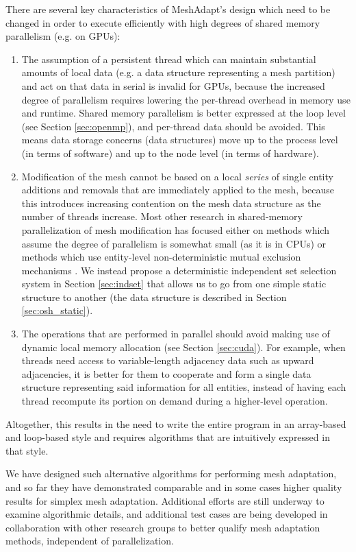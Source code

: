 There are several key characteristics of MeshAdapt's design
which need to be changed in order to execute efficiently with
high degrees of shared memory parallelism (e.g. on GPUs):
\begin{enumerate}
\item The assumption of a persistent thread which can maintain
substantial amounts of local data (e.g. a data structure
representing a mesh partition) and act on that data in serial
is invalid for GPUs, because the increased degree of parallelism
requires lowering the per-thread overhead in memory use and runtime.
Shared memory parallelism is better expressed at the loop level
(see Section \ref{sec:openmp}), and per-thread data should be avoided.
This means data storage concerns (data structures) move up to
the process level (in terms of software) and up to the
node level (in terms of hardware).
\item Modification of the mesh cannot be based on a local \emph{series}
of single entity additions and removals that are immediately
applied to the mesh, because this
introduces increasing contention on the mesh data structure
as the number of threads increase.
Most other research in shared-memory parallelization of mesh modification
has focused either on methods which assume the degree of parallelism
is somewhat small \cite{remacle2015two} (as it is in CPUs) or
methods which use entity-level non-deterministic mutual exclusion
mechanisms \cite{navarro2011parallel}.
We instead propose a deterministic independent set selection system
in Section \ref{sec:indset} that allows us to go from one
simple static structure to another
(the data structure is described in Section \ref{sec:osh_static}).
\item The operations that are performed in parallel should
avoid making use of dynamic local memory allocation
(see Section \ref{sec:cuda}).
For example, when threads need access to variable-length adjacency
data such as upward adjacencies, it is better for them to
cooperate and form a single data structure representing said
information for all entities, instead of having each thread
recompute its portion on demand during a higher-level operation.
\end{enumerate}
Altogether, this results in the need to write the entire program
in an array-based and loop-based style and requires algorithms that
are intuitively expressed in that style.

We have designed such alternative algorithms for performing mesh
adaptation, and so far they have demonstrated
comparable and in some cases higher quality results
for simplex mesh adaptation.
Additional efforts are still underway to examine algorithmic details,
and additional test cases are being developed in collaboration with
other research groups to better qualify mesh adaptation methods,
independent of parallelization.

